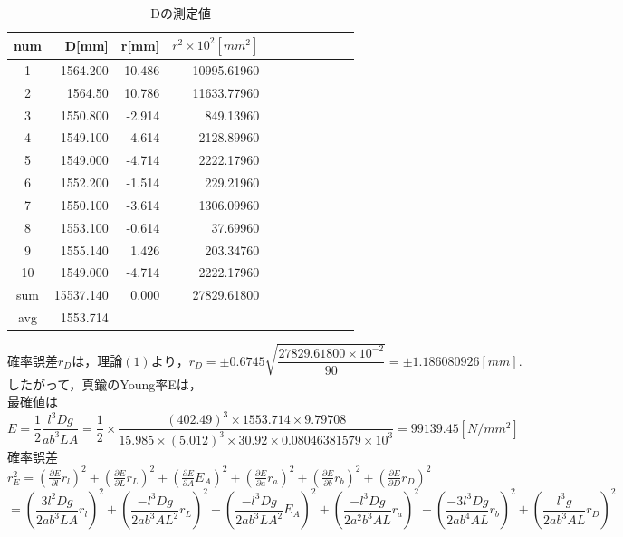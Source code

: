 \documentclass[a4paper,1pt]{jsarticle}
\begin{document}
\begin{table}[H]
  \caption{Dの測定値}
  \label{table:SpeedOfLight}
  \centering
  \begin{tabular}{|c||r|r|r|r|r|r|r|r|r|r|}
    \hline
    num & D[mm] & r[mm] & $r^2\times10^2[mm^2]$ \\
    \hline\hline
    1 & 1564.200 & 10.486  & 10995.61960 \\
    2 & 1564.50 & 10.786  & 11633.77960 \\
    3 & 1550.800 & -2.914  & 849.13960 \\
    4 & 1549.100 & -4.614  & 2128.89960 \\
    5 & 1549.000 & -4.714  & 2222.17960 \\
    6 & 1552.200 & -1.514  & 229.21960 \\
    7 & 1550.100 & -3.614  & 1306.09960 \\
    8 & 1553.100 & -0.614  & 37.69960 \\
    9 & 1555.140 & 1.426  & 203.34760 \\
    10 & 1549.000 & -4.714  & 2222.17960 \\
    \hline\hline
    sum & 15537.140  & 0.000  & 27829.61800 \\
    \hline
    avg  & 1553.714 &  &  \\

    \hline
  \end{tabular}

\end{table}

$確率誤差r_Dは，理論(1)より，r_D=\pm0.6745\sqrt{\dfrac{27829.61800\times10^{-2}}{90}}=\pm1.186080926[mm].$\\

したがって，真鍮のYoung率Eは，\\

最確値は$E=\dfrac{1}{2}\dfrac{l^3Dg}{ab^3LA}=\dfrac{1}{2}\times\dfrac{(402.49)^3\times1553.714\times9.79708}{15.985\times(5.012)^3\times30.92\times0.08046381579\times10^{3}}=99139.45[N/mm^2]$\\

確率誤差$r_E^2=(\frac{\partial E}{\partial l}r_{l})^2+(\frac{\partial E}{\partial L}r_{L})^2+(\frac{\partial E}{\partial A}E_{A})^2+(\frac{\partial E}{\partial a}r_{a})^2+(\frac{\partial E}{\partial b}r_{b})^2+(\frac{\partial E}{\partial D}r_{D})^2$\\

$=(\dfrac{3l^2Dg}{2ab^3LA}r_l)^2+(\dfrac{-l^3Dg}{2ab^3AL^2}r_L)^2+(\dfrac{-l^3Dg}{2ab^3LA^2}E_A)^2+(\dfrac{-l^3Dg}{2a^2b^3AL}r_a)^2+(\dfrac{-3l^3Dg}{2ab^4AL}r_b)^2+(\dfrac{l^3g}{2ab^3AL}r_D)^2$\\
\end{document}
